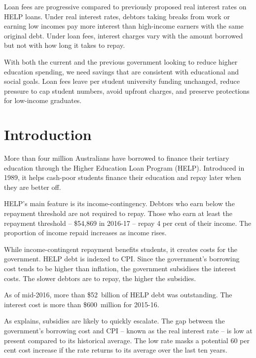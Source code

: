 \documentclass[embargoed]{grattan}
\begin{document}
\begin{overview}
Loan fees are progressive compared to previously proposed real interest rates on \gls{HELP} loans.
Under real interest rates, debtors taking breaks from work or earning low incomes pay more interest than high-income earners with the same original debt.
Under loan fees, interest charges vary with the amount borrowed but not with how long it takes to repay.

With both the current and the previous government looking to reduce higher education spending, we need savings that are consistent with educational and social goals.
Loan fees leave per student university funding unchanged, reduce pressure to cap student numbers, avoid upfront charges, and preserve protections for low-income graduates.
\end{overview}

\contentspage
\listoffigures



\chapter{{Introduction}}\label{chap:1-introduction}

More than four million Australians have borrowed to finance their tertiary education through the Higher Education Loan Program (HELP).
Introduced in 1989, it helps cash-poor students finance their education and repay later when they are better off.

\gls{HELP}'s main feature is its income-contingency.
Debtors who earn below the repayment threshold are not required to repay.
Those who earn at least the repayment threshold -- \$54,869 in 2016-17 -- repay 4 per cent of their income.
The proportion of income repaid increases as income rises.

While income-contingent repayment benefits students, it creates costs for the government.
\gls{HELP} debt is indexed to \gls{CPI}.
Since the government's borrowing cost tends to be higher than inflation, the government subsidises the interest costs.
The slower debtors are to repay, the higher the subsidies.

As of mid-2016, more than \$52~billion of \gls{HELP} debt was outstanding.
The interest cost is more than \$600~million for 2015-16.

As  explains, subsidies are likely to quickly escalate.
The gap between the government's borrowing cost and \gls{CPI} -- known as the real interest rate -- is low at present compared to its historical average.
The low rate masks a potential 60 per cent cost increase if the rate returns to its average over the last ten years.
\end{document}
